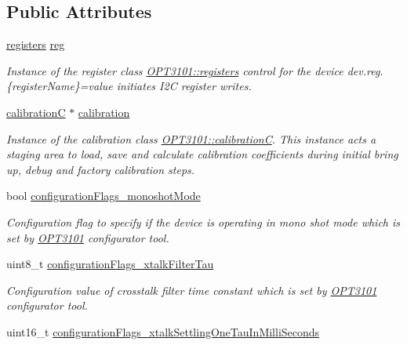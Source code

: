 \subsection*{Public Attributes}
\begin{DoxyCompactItemize}
\item 
\mbox{\hyperlink{class_o_p_t3101_1_1registers}{registers}} \mbox{\hyperlink{class_o_p_t3101_1_1device_a0b36f012c21e9554a616c65ab3aa528b}{reg}}
\begin{DoxyCompactList}\small\item\em Instance of the register class \mbox{\hyperlink{class_o_p_t3101_1_1registers}{O\+P\+T3101\+::registers}} control for the device dev.\+reg.\{register\+Name\}=value initiates I2C register writes. \end{DoxyCompactList}\item 
\mbox{\hyperlink{class_o_p_t3101_1_1calibration_c}{calibrationC}} $\ast$ \mbox{\hyperlink{class_o_p_t3101_1_1device_a808c6e99f30fc4f21bee018f351f560d}{calibration}}
\begin{DoxyCompactList}\small\item\em Instance of the calibration class \mbox{\hyperlink{class_o_p_t3101_1_1calibration_c}{O\+P\+T3101\+::calibrationC}}. This instance acts a staging area to load, save and calculate calibration coefficients during initial bring up, debug and factory calibration steps. \end{DoxyCompactList}\item 
bool \mbox{\hyperlink{class_o_p_t3101_1_1device_a5ddd31b24f0caf9335ec8f8cc50584b2}{configuration\+Flags\+\_\+monoshot\+Mode}}
\begin{DoxyCompactList}\small\item\em Configuration flag to specify if the device is operating in mono shot mode which is set by \mbox{\hyperlink{namespace_o_p_t3101}{O\+P\+T3101}} configurator tool. \end{DoxyCompactList}\item 
uint8\+\_\+t \mbox{\hyperlink{class_o_p_t3101_1_1device_a93f398cf6cf57975f673afbab7ba9603}{configuration\+Flags\+\_\+xtalk\+Filter\+Tau}}
\begin{DoxyCompactList}\small\item\em Configuration value of crosstalk filter time constant which is set by \mbox{\hyperlink{namespace_o_p_t3101}{O\+P\+T3101}} configurator tool. \end{DoxyCompactList}\item 
uint16\+\_\+t \mbox{\hyperlink{class_o_p_t3101_1_1device_a9c579bc94d5a43a464129f5b67314eac}{configuration\+Flags\+\_\+xtalk\+Settling\+One\+Tau\+In\+Milli\+Seconds}}

\end{DoxyCompactItemize}
